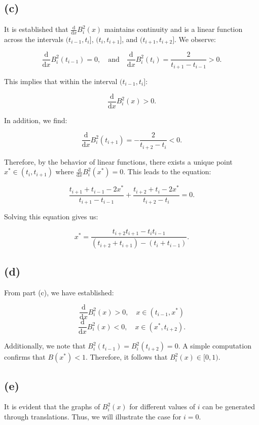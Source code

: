 \documentclass[a4paper]{article}
\begin{document}
\subsection*{(c)}
It is established that \(\frac{\text{d}}{\text{d}x}B_i^2(x)\) maintains continuity and is a linear function across the intervals \((t_{i-1}, t_i]\), \((t_i, t_{i+1}]\), and \((t_{i+1}, t_{i+2}]\). We observe:

\[
\frac{\text{d}}{\text{d}x}B_i^2(t_{i-1}) = 0, \quad \text{and} \quad \frac{\text{d}}{\text{d}x}B_i^2(t_i) = \frac{2}{t_{i+1}-t_{i-1}} > 0.
\]

This implies that within the interval \((t_{i-1}, t_i]\):

\[
\frac{\text{d}}{\text{d}x}B_i^2(x) > 0.
\]

In addition, we find:

\[
\frac{\text{d}}{\text{d}x}B_i^2(t_{i+1}) = -\frac{2}{t_{i+2}-t_i} < 0.
\]

Therefore, by the behavior of linear functions, there exists a unique point \(x^* \in (t_i, t_{i+1})\) where \(\frac{\text{d}}{\text{d}x}B_i^2(x^*) = 0\). This leads to the equation:

\[
\frac{t_{i+1}+t_{i-1}-2x^*}{t_{i+1}-t_{i-1}} + \frac{t_{i+2}+t_i-2x^*}{t_{i+2}-t_i} = 0.
\]

Solving this equation gives us:

\[
x^* = \frac{t_{i+2}t_{i+1} - t_it_{i-1}}{(t_{i+2}+t_{i+1}) - (t_i+t_{i-1})}.
\]

\subsection*{(d)}

From part (c), we have established:

\[
\frac{\text{d}}{\text{d}x}B_i^2(x) > 0, \quad x \in (t_{i-1}, x^*)
\]
\[
\frac{\text{d}}{\text{d}x}B_i^2(x) < 0, \quad x \in (x^*, t_{i+2}).
\]

Additionally, we note that \(B_i^2(t_{i-1}) = B_i^2(t_{i+2}) = 0\). A simple computation confirms that \(B(x^*) < 1\). Therefore, it follows that \(B_i^2(x) \in [0, 1)\).

\subsection*{(e)}

It is evident that the graphs of \(B_i^2(x)\) for different values of \(i\) can be generated through translations. Thus, we will illustrate the case for \(i = 0\).
\end{document}
